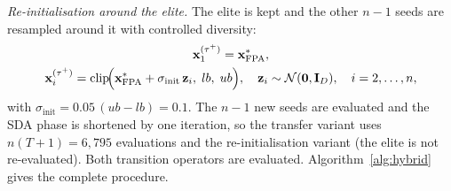 \documentclass[10pt,letterpaper]{article}
\newcommand{\clip}{\operatorname{clip}}
\begin{document}
\emph{Re-initialisation around the elite.} The elite is kept and the other $n-1$ seeds are resampled around it with controlled diversity:
\begin{equation}
\begin{gathered}
\mathbf{x}_1^{(\tau^{+})}=\mathbf{x}^{*}_{\mathrm{FPA}},\\
\mathbf{x}_i^{(\tau^{+})}=\clip\!\Bigl(\mathbf{x}^{*}_{\mathrm{FPA}}+\sigma_{\mathrm{init}}\,\mathbf{z}_i,\;lb,\;ub\Bigr),\quad \mathbf{z}_i\sim\mathcal{N}(\mathbf{0},\mathbf{I}_D),\quad i=2,\dots,n,
\end{gathered}
\label{eq:reinit}
\end{equation}
with $\sigma_{\mathrm{init}}=0.05\,(ub-lb)=0.1$. The $n-1$ new seeds are evaluated and the SDA phase is shortened by one iteration, so the transfer variant uses $n(T+1)=6{,}795$ evaluations and the re-initialisation variant \EvalsReinit{} (the elite is not re-evaluated). Both transition operators are evaluated. Algorithm~\ref{alg:hybrid} gives the complete procedure.
\end{document}
